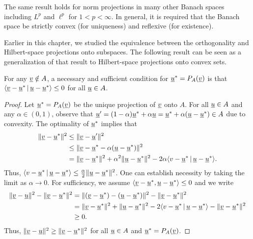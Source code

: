 \begin{remark}
The same result holds for norm projections in many other Banach spaces including $L^{p}$ and $\ell^{p}$ for $1<p<\infty$. In general, it is required that the Banach space be strictly convex (for uniqueness) and reflexive (for existence).
\end{remark}

Earlier in this chapter, we studied the equivalence between the orthogonality and Hilbert-space projections onto subspaces.
The following result can be seen as a generalization of that result to Hilbert-space projections onto convex sets.

\begin{lemma}
\label{lemma:convex_proj_lt0}
For any $\underline{v} \notin A$, a necessary and sufficient condition for $\underline{u}^* = P_A (\underline{v})$ is that $\langle \underline{v}-\underline{u}^* \,|\, \underline{u}-\underline{u}^* \rangle \leq 0$ for all $\underline{u}\in A$.
\end{lemma}
\begin{proof}
Let $\underline{u}^* = P_A (\underline{v})$ be the unique projection of $\underline{v}$ onto $A$.
For all $\underline{u} \in A$ %
and any $\alpha\in (0,1)$, observe that $\underline{u}'=(1-\alpha) \underline{u}^* + \alpha \underline{u} = \underline{u}^* + \alpha (\underline{u}-\underline{u}^*)\in A$ due to convexity.
The optimality of $\underline{u}^*$ implies that
\begin{align*}
\| \underline{v}-\underline{u}^* \|^2
&\leq \| \underline{v}- \underline{u}' \|^2 \\
&\leq \| \underline{v}- \underline{u}^* - \alpha (\underline{u}-\underline{u}^*) \|^2 \\
&= \| \underline{v} - \underline{u}^* \|^2 + \alpha^2 \| \underline{u} - \underline{u}^* \|^2 - 2 \alpha \langle v-\underline{u}^* \,|\, \underline{u}-\underline{u}^* \rangle. 
\end{align*}
Thus, $\langle v-\underline{u}^* \,|\, \underline{u}-\underline{u}^* \rangle \leq \frac{\alpha}{2} \| \underline{u} - \underline{u}^* \|^2$.
One can establish necessity by taking the limit as $\alpha \to 0$.
For sufficiency, we assume $\langle \underline{v}-\underline{u}^*,\underline{u}-\underline{u}^* \rangle \leq 0$ and we write
\begin{align*}
\| \underline{v}-\underline{u} \|^2 - \| \underline{v} - \underline{u}^* \|^2
&= \| (\underline{v} - \underline{u}^*) - (\underline{u} - \underline{u}^*) \|^2 - \|\underline{v} - \underline{u}^* \|^2 \\
&= \| \underline{v}-\underline{u}^* \|^2 + \| \underline{u} -\underline{u}^* \| ^2 - 2 \langle v-\underline{u}^* \,|\, \underline{u}-\underline{u}^* \rangle - \|\underline{v}-\underline{u}^* \|^2 \\
&\geq 0.
\end{align*}
Thus, $\| \underline{v}-\underline{u} \|^2 \geq \| \underline{v} - \underline{u}^* \|^2$ for all $\underline{u} \in A$ and $\underline{u}^* = P_A (\underline{v})$.
\end{proof}

